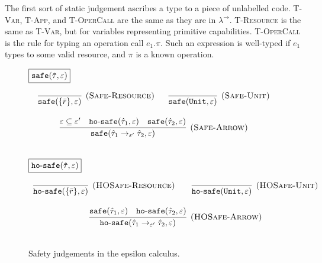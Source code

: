 \noindent
The first sort of static judgement ascribes a type to a piece of unlabelled code. \textsc{T-Var}, \textsc{T-App}, and \textsc{T-OperCall} are the same as they are in $\lambda^{\rightarrow}$. \textsc{T-Resource} is the same as \textsc{T-Var}, but for variables representing primitive capabilities. \textsc{T-OperCall} is the rule for typing an operation call $e_1.\pi$. Such an expression is well-typed if $e_1$ types to some valid resource, and $\pi$ is a known operation.


\begin{figure}[h]

\noindent
$\fbox{$\mathtt{safe(\hat \tau, \varepsilon)}$}$

\[
\begin{array}{c}

\infer[\textsc{(Safe-Resource)}]
	{\kwa{safe}(\{ \bar r \}, \varepsilon)}
	{}
~~~~~
\infer[\textsc{(Safe-Unit)}]
	{\kwa{safe}(\kwa{Unit}, \varepsilon)}
	{} \\[3ex]

\infer[\textsc{(Safe-Arrow)}]
	{\kwa{safe}(\hat \tau_1 \rightarrow_{\varepsilon'} \hat \tau_2, \varepsilon)}
	{\varepsilon \subseteq \varepsilon' & \kwa{ho \hyphen safe}(\hat \tau_1, \varepsilon) & \kwa{safe}(\hat \tau_2, \varepsilon)} \\[3ex]

\end{array}
\]

\noindent
$\fbox{$\mathtt{ho \hbox{-} safe(\hat \tau, \varepsilon)}$}$

\[
\begin{array}{c}

\infer[\textsc{(HOSafe-Resource)}]
	{ \kwa{ho \hyphen safe}( \{ \bar r \}, \varepsilon)} 
	{}
	~~~~~~
\infer[\textsc{(HOSafe-Unit)}]
	{ \kwa{ho \hyphen safe}( \kwa{Unit}, \varepsilon)} 
	{}\\[3ex]

\infer[\textsc{(HOSafe-Arrow)}]
	{ \kwa{ho \hyphen safe}( \hat \tau_1 \rightarrow_{\varepsilon'} \hat \tau_2, \varepsilon ) }
	{ \kwa{safe}(\hat \tau_1, \varepsilon)  & \kwa{ho \hyphen safe}(\hat \tau_2, \varepsilon) }\\[3ex]

\end{array}
\]

\vspace{-7pt}
\caption{Safety judgements in the epsilon calculus.}
\label{This is the label.}
\end{figure}

